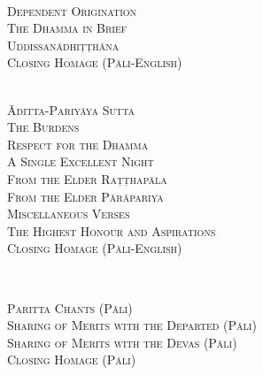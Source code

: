 {  \clearpage

  {\libertinusFont\selectfont\textbf{\textsc{}}}\\

  \textsc{
    Dependent Origination \pageref{dependent-origination}\\
    The Dhamma in Brief \pageref{dhamma-in-brief}\\
    Uddissanādhiṭṭhāna \pageref{uddissanadhitthana}\\
    Closing Homage (Pāli-English) \pageref{closing-homage}}\\


  {\libertinusFont\selectfont\textbf{\textsc{}}}\\

  \textsc{
    Āditta-Pariyāya Sutta \pageref{aditta-pariyaya}\\
    The Burdens \pageref{burdens}\\
    Respect for the Dhamma \pageref{respect-for-the-dhamma}\\
    A Single Excellent Night \pageref{single-excellent-night}\\
    From the Elder Raṭṭhapāla \pageref{ratthapala}\\
    From the Elder Pārāpariya \pageref{parapariya}\\
    Miscellaneous Verses \pageref{misc-verses}\\
    The Highest Honour and Aspirations \pageref{highest-honour-aspirations}\\
    Closing Homage (Pāli-English) \pageref{closing-homage}}\\

  \clearpage

  {\libertinusFont\selectfont\textbf{\textsc{}}}\\

  \textsc{
    Paritta Chants (Pāli) \pageref{deva-aradhana}\\
    Sharing of Merits with the Departed (Pāli) \pageref{sharing-merits-departed}\\
    Sharing of Merits with the Devas (Pāli) \pageref{sharing-merits-devas}\\
    Closing Homage (Pāli) \pageref{closing-homage}}\\


}
